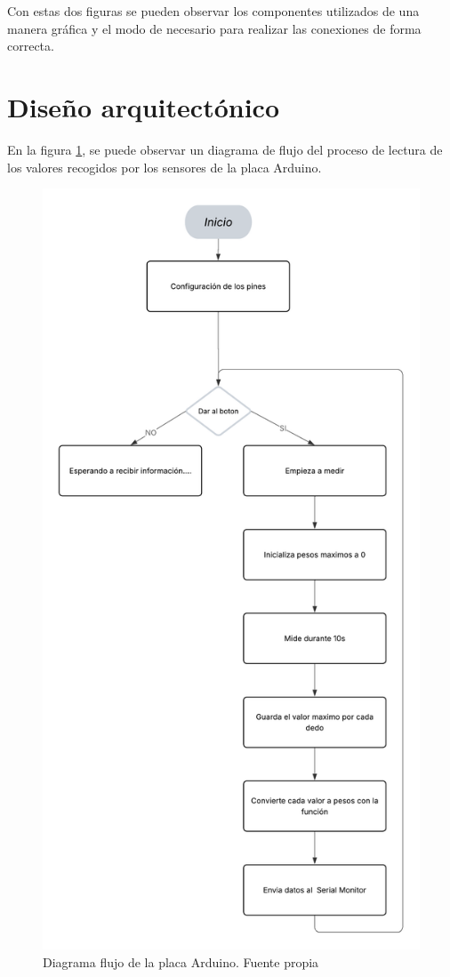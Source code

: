 Con estas dos figuras se pueden observar los componentes utilizados de una manera gráfica y el modo de necesario para realizar las conexiones de forma correcta.

\section{Diseño arquitectónico}

En la figura \ref{fig:Diagrama_flujo_arduino}, se puede observar un diagrama de flujo del proceso de lectura de los valores recogidos por los sensores de la placa Arduino. 

\begin{figure}
    \centering
    \includegraphics[width=0.5\linewidth]{img/Diagrama_flujo_arduino.png}
    \caption{Diagrama flujo de la placa Arduino. Fuente propia}
    \label{fig:Diagrama_flujo_arduino}
\end{figure}


